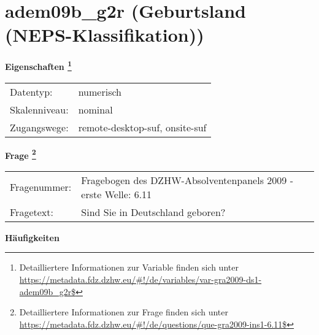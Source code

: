 
    \setcounter{footnote}{0}

    \vspace*{-1.8cm}
	\section{adem09b\_g2r (Geburtsland (NEPS-Klassifikation))}
	\label{section:adem09b_g2r}



    \vspace*{0.5cm}
    \noindent\textbf{Eigenschaften
	\footnote{Detailliertere Informationen zur Variable finden sich unter
		\url{https://metadata.fdz.dzhw.eu/\#!/de/variables/var-gra2009-ds1-adem09b_g2r$}}}\\
	\begin{tabularx}{\hsize}{@{}lX}
	Datentyp: & numerisch \\
	Skalenniveau: & nominal \\
	Zugangswege: &
	  remote-desktop-suf, 
	  onsite-suf
 \\
    \end{tabularx}



				\vspace*{0.5cm}
                \noindent\textbf{Frage
	                \footnote{Detailliertere Informationen zur Frage finden sich unter
		              \url{https://metadata.fdz.dzhw.eu/\#!/de/questions/que-gra2009-ins1-6.11$}}}\\
				\begin{tabularx}{\hsize}{@{}lX}
					Fragenummer: &
					  Fragebogen des DZHW-Absolventenpanels 2009 - erste Welle:
					  6.11
 \\
					Fragetext: & Sind Sie in Deutschland geboren? \\
				\end{tabularx}





        		\vspace*{0.5cm}
                \noindent\textbf{Häufigkeiten}

